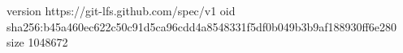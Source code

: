 version https://git-lfs.github.com/spec/v1
oid sha256:b45a460ec622c50c91d5ca96cdd4a8548331f5df0b049b3b9af188930ff6e280
size 1048672
